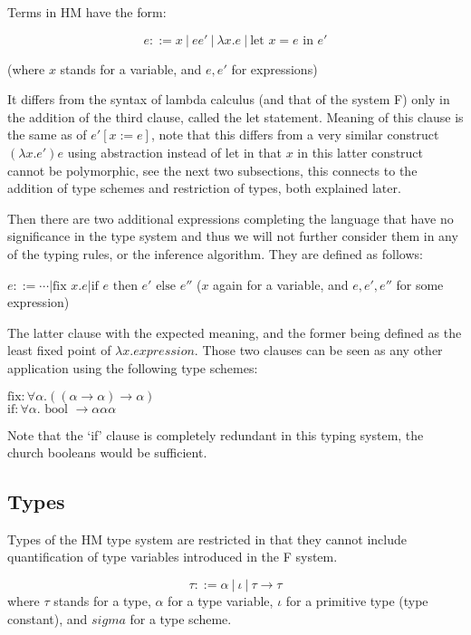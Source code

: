 Terms in HM have the form:

$$e ::= x\ |\ e e'\ |\ \lambda x . e\ |\ \text{let } x = e \text{ in } e'$$ %

(where $x$ stands for a variable, and $e, e'$ for expressions)

It differs from the syntax of lambda calculus (and that of the system F) only in the addition of the third clause, called the let statement. Meaning of this clause is the same as of $e' [x := e]$, note that this differs from a very similar construct $(\lambda x . e') e$ using abstraction instead of let in that $x$ in this latter construct cannot be polymorphic, see the next two subsections, this connects to the addition of type schemes and restriction of types, both explained later. %

Then there are two additional expressions completing the language that have no significance in the type system and thus we will not further consider them in any of the typing rules, or the inference algorithm. They are defined as follows: %

$e ::= \cdots | \text{fix } x . e | \text{if } e \text{ then } e' \text{ else } e''$ %
($x$ again for a variable, and $e, e', e''$ for some expression)

The latter clause with the expected meaning, and the former being defined as the least fixed point of $\lambda x . expression$. Those two clauses can be seen as any other application using the following type schemes:

$\text{fix}: \forall \alpha . ((\alpha \rightarrow \alpha) \rightarrow \alpha)$ \\
$\text{if}: \forall \alpha . \text{ bool } \rightarrow \alpha \alpha \alpha$ %

Note that the `if' clause is completely redundant in this typing system, the church booleans would be sufficient. %


\subsection{Types}

Types of the HM type system are restricted in that they cannot include quantification of type variables introduced in the F system.

\begin{defn}[Type]
    $$\tau ::= \alpha\ |\ \iota\ |\ \tau \rightarrow \tau$$
    where $\tau$ stands for a type, $\alpha$ for a type variable, $\iota$ for a primitive type (type constant), and $sigma$ for a type scheme. %
\end{defn}

